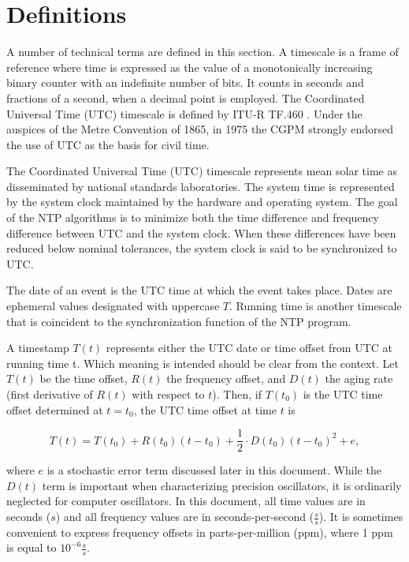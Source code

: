 \chapter{Definitions}
\label{section-4}

A number of technical terms are defined in this section. A timescale
is a frame of reference where time is expressed as the value of a
monotonically increasing binary counter with an indefinite number of
bits. It counts in seconds and fractions of a second, when a decimal
point is employed. The Coordinated Universal Time (UTC) timescale is
defined by ITU-R TF.460 \cite{ITU-R TF.460}. Under the auspices of the
Metre Convention of 1865, in 1975 the CGPM \cite{CGPM} strongly endorsed
the use of UTC as the basis for civil time.

The Coordinated Universal Time (UTC) timescale represents mean solar
time as disseminated by national standards laboratories. The system
time is represented by the system clock maintained by the hardware
and operating system. The goal of the NTP algorithms is to minimize
both the time difference and frequency difference between UTC and the
system clock. When these differences have been reduced below nominal
tolerances, the system clock is said to be synchronized to UTC.

The date of an event is the UTC time at which the event takes place.
Dates are ephemeral values designated with uppercase $ T $. Running time
is another timescale that is coincident to the synchronization
function of the NTP program.

A timestamp $ T(t) $ represents either the UTC date or time offset from
UTC at running time t. Which meaning is intended should be clear
from the context. Let $ T(t) $ be the time offset, $ R(t) $ the frequency
offset, and $ D(t) $ the aging rate (first derivative of $ R(t) $ with
respect to $ t $). Then, if $ T(t_0) $ is the UTC time offset determined at
$ t = t_0 $, the UTC time offset at time $ t $ is

$$
T(t) = T(t_0) + R(t_0)(t - t_0) + \frac{1}{2} \cdot D(t_0)(t - t_0)^2 + e,
$$

where $ e $ is a stochastic error term discussed later in this document.
While the $ D(t) $ term is important when characterizing precision
oscillators, it is ordinarily neglected for computer oscillators. In
this document, all time values are in seconds ($ s $) and all frequency
values are in seconds-per-second ($ \frac{s}{s} $). It is sometimes convenient
to express frequency offsets in parts-per-million (ppm), where 1 ppm
is equal to $ 10^{-6} \frac{s}{s} $.

